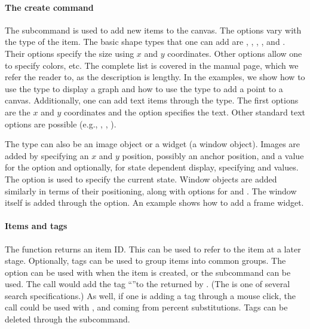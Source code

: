 \paragraph{The create command}
The subcommand  is used
to add new items to the canvas. The options vary with the type of the
item. The basic shape types that one can add are ,
, , , and
. Their options specify the size using $x$ and $y$
coordinates. Other options allow one to specify colors, etc. The
complete list is covered in the  manual page, which we
refer the reader to, as the description is lengthy.  In the examples,
we show how to use the  type to display a graph and how to
use the  type to add a point to a canvas. Additionally,
one can add text items through the  type. The first
options are the $x$ and $y$ coordinates and the  option
specifies the text.  Other standard text options are possible (e.g.,
, , ).

The type can also be an image object or a widget (a window
object). Images are added by specifying an $x$ and $y$ position,
possibly an anchor position, and a value for the  option
and optionally, for state dependent display, specifying
 and  values. The
 option is used to specify the current state. Window
objects are added similarly in terms of their positioning, along with
options for  and . The window itself is
added through the  option. An example shows how to add a
frame widget.



\paragraph{Items and tags}
The  function returns an item ID. This can be
used to refer to the item at a later stage. Optionally, tags can be
used to group items into common groups. The  option can be
used with  when the item is created, or the
 subcommand can be used. The call
 would add the tag
``''to the  returned by . (The
 is one of several search specifications.) As well, if
one is adding a tag through a mouse click, the call  could be used with , 
and  coming from percent substitutions. Tags can be deleted
through the  subcommand.

